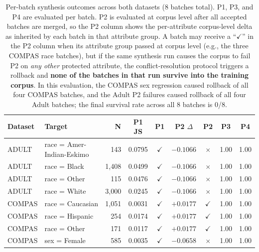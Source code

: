 \documentclass[11pt]{article}
\begin{document}
\begin{table}[h]
\centering
\small
\caption{Per-batch synthesis outcomes across both datasets (8 batches total). P1, P3, and P4 are evaluated per batch. P2 is evaluated at corpus level after all accepted batches are merged, so the P2 column shows the per-attribute corpus-level delta as inherited by each batch in that attribute group. A batch may receive a ``$\checkmark$'' in the P2 column when its attribute group passed at corpus level (e.g., the three COMPAS race batches), but if the same synthesis run causes the corpus to fail P2 on \emph{any other} protected attribute, the conflict-resolution protocol triggers a rollback and \textbf{none of the batches in that run survive into the training corpus}. In this evaluation, the COMPAS sex regression caused rollback of all four COMPAS batches, and the Adult P2 failures caused rollback of all four Adult batches; the final survival rate across all 8 batches is 0/8.}
\label{tab:synthesis}
\begin{tabular}{llrcccccc}
\toprule
\textbf{Dataset} & \textbf{Target} & \textbf{N} & \textbf{P1 JS} & \textbf{P1} & \textbf{P2 $\Delta$} & \textbf{P2} & \textbf{P3} & \textbf{P4} \\
\midrule
ADULT  & race = Amer-Indian-Eskimo & 143   & 0.0795 & $\checkmark$ & $-0.1066$ & $\times$ & 1.00 & 1.00 \\
ADULT  & race = Black              & 1{,}408 & 0.0499 & $\checkmark$ & $-0.1066$ & $\times$ & 1.00 & 1.00 \\
ADULT  & race = Other              & 115   & 0.0476 & $\checkmark$ & $-0.1066$ & $\times$ & 1.00 & 1.00 \\
ADULT  & race = White              & 3{,}000 & 0.0245 & $\checkmark$ & $-0.1066$ & $\times$ & 1.00 & 1.00 \\
COMPAS & race = Caucasian          & 1{,}051 & 0.0031 & $\checkmark$ & $+0.0177$ & $\checkmark$ & 1.00 & 1.00 \\
COMPAS & race = Hispanic           & 254   & 0.0174 & $\checkmark$ & $+0.0177$ & $\checkmark$ & 1.00 & 1.00 \\
COMPAS & race = Other              & 171   & 0.0117 & $\checkmark$ & $+0.0177$ & $\checkmark$ & 1.00 & 1.00 \\
COMPAS & sex  = Female             & 585   & 0.0035 & $\checkmark$ & $-0.0658$ & $\times$ & 1.00 & 1.00 \\
\bottomrule
\end{tabular}
\end{table}
\end{document}
